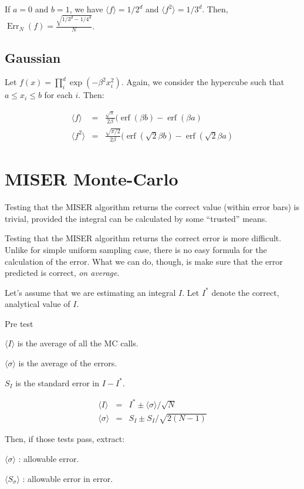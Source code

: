 \documentclass[a4paper]{article}
\newcommand{\expval}[1]{\langle #1 \rangle}
\DeclareMathOperator{\Err}{Err}
\DeclareMathOperator{\erf}{erf}
\begin{document}
If $a = 0$ and $b=1$, we have $\expval{f} = 1/2^d$ and $\expval{f^2} = 1/3^d$.
Then, $\Err_N(f) = \frac{\sqrt{1/3^d - 1/4^d}}{N}$.


\subsection{Gaussian}

Let $f(x) = \prod_i^d \exp(-\beta^2 x_i^2)$. Again, we consider the
hypercube such that $a \le x_i \le b$ for each $i$. Then:

\begin{eqnarray}
    \expval{f} &=& \frac{\sqrt{\pi}}{2\beta} (\erf(\beta b) - \erf(\beta a) \\
    \expval{f^2} &=& \frac{\sqrt{\pi/2}}{2\beta} (\erf(\sqrt{2}\beta b) -
    \erf(\sqrt{2}\beta a)
\end{eqnarray}


\section{MISER Monte-Carlo}

Testing that the MISER algorithm returns the correct value (within error bars)
is trivial, provided the integral can be calculated by some ``trusted'' means.

Testing that the MISER algorithm returns the correct error is more difficult.
Unlike for simple uniform sampling case, there is no easy formula for the
calculation of the error. What we can do, though, is make sure that the error
predicted is correct, \emph{on average}. 

Let's assume that we are estimating an integral $I$. Let $I^*$ denote the
correct, analytical value of $I$. 

Pre test

$\langle I \rangle$ is the average of all the MC calls.

$\expval{\sigma}$ is the average of the errors.

$S_I$ is the standard error in $I-I^*$.

\begin{eqnarray}
    \langle I \rangle &=& I^* \pm \langle\sigma\rangle/\sqrt{N} \\
    \langle \sigma \rangle &=& S_I \pm S_I / \sqrt{2(N-1)}
\end{eqnarray}

Then, if those tests pass, extract:

$\expval{\sigma}$ : allowable error.

$\expval{S_\sigma}$ : allowable error in error.
\end{document}

